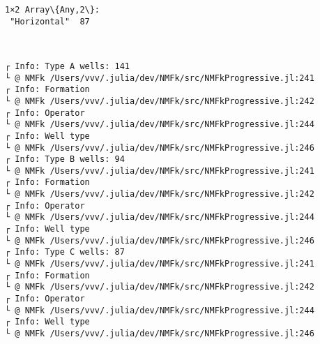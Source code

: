 \documentclass[11pt]{article}
\begin{document}
    
    
    \begin{Verbatim}[commandchars=\\\{\}]
1×2 Array\{Any,2\}:
 "Horizontal"  87
    \end{Verbatim}

    
    \begin{center}
    \end{center}
    { \hspace*{\fill} \\}
    
    \begin{Verbatim}[commandchars=\\\{\}]
┌ Info: Type A wells: 141
└ @ NMFk /Users/vvv/.julia/dev/NMFk/src/NMFkProgressive.jl:241
┌ Info: Formation
└ @ NMFk /Users/vvv/.julia/dev/NMFk/src/NMFkProgressive.jl:242
┌ Info: Operator
└ @ NMFk /Users/vvv/.julia/dev/NMFk/src/NMFkProgressive.jl:244
┌ Info: Well type
└ @ NMFk /Users/vvv/.julia/dev/NMFk/src/NMFkProgressive.jl:246
┌ Info: Type B wells: 94
└ @ NMFk /Users/vvv/.julia/dev/NMFk/src/NMFkProgressive.jl:241
┌ Info: Formation
└ @ NMFk /Users/vvv/.julia/dev/NMFk/src/NMFkProgressive.jl:242
┌ Info: Operator
└ @ NMFk /Users/vvv/.julia/dev/NMFk/src/NMFkProgressive.jl:244
┌ Info: Well type
└ @ NMFk /Users/vvv/.julia/dev/NMFk/src/NMFkProgressive.jl:246
┌ Info: Type C wells: 87
└ @ NMFk /Users/vvv/.julia/dev/NMFk/src/NMFkProgressive.jl:241
┌ Info: Formation
└ @ NMFk /Users/vvv/.julia/dev/NMFk/src/NMFkProgressive.jl:242
┌ Info: Operator
└ @ NMFk /Users/vvv/.julia/dev/NMFk/src/NMFkProgressive.jl:244
┌ Info: Well type
└ @ NMFk /Users/vvv/.julia/dev/NMFk/src/NMFkProgressive.jl:246
    \end{Verbatim}

    \begin{center}
    \end{center}
    { \hspace*{\fill} \\}
    
    \begin{Verbatim}[commandchars=\\\{\}]

    \end{Verbatim}

    \begin{center}
    \end{center}
    { \hspace*{\fill} \\}
    
\end{document}
